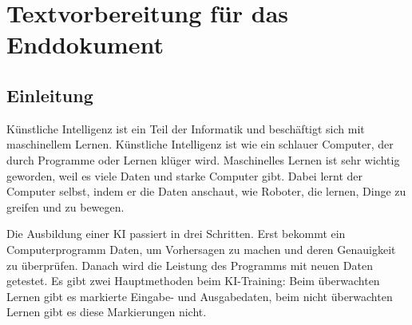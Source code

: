 \section{Textvorbereitung für das Enddokument}
\subsection{Einleitung}

Künstliche Intelligenz ist ein Teil der Informatik und beschäftigt sich mit maschinellem Lernen.
Künstliche Intelligenz ist wie ein schlauer Computer, der durch Programme oder Lernen klüger wird. Maschinelles Lernen ist sehr wichtig geworden, weil es viele Daten und starke Computer gibt. Dabei lernt der Computer selbst, indem er die Daten anschaut, wie Roboter, die lernen, Dinge zu greifen und zu bewegen.

Die Ausbildung einer KI passiert in drei Schritten. Erst bekommt ein Computerprogramm Daten, um Vorhersagen zu machen und deren Genauigkeit zu überprüfen. Danach wird die Leistung des Programms mit neuen Daten getestet. Es gibt zwei Hauptmethoden beim KI-Training: Beim überwachten Lernen gibt es markierte Eingabe- und Ausgabedaten, beim nicht überwachten Lernen gibt es diese Markierungen nicht.